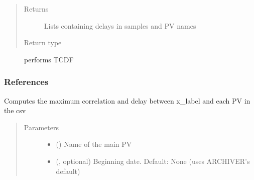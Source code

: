 \documentclass[letterpaper,10pt,english]{sphinxmanual}
\begin{document}
\begin{fulllineitems}
\begin{fulllineitems}
\begin{quote}
\begin{description}
\begin{itemize}
\end{itemize}

\item[{Returns}] \leavevmode
\sphinxAtStartPar
Lists containing delays in samples and PV names

\item[{Return type}] \leavevmode
\sphinxAtStartPar
{}

\end{description}\end{quote}


\nopagebreak

\begin{description}
\item[{}] \leavevmode
\sphinxAtStartPar
performs TCDF

\end{description}


\subsubsection*{References}

\end{fulllineitems}


\begin{fulllineitems}
\label{\detokenize{dataset:dataset.Dataset.correlate}}
\sphinxAtStartPar
Computes the maximum correlation and delay between x\_label and each PV in the csv
\begin{quote}\begin{description}
\item[{Parameters}] \leavevmode\begin{itemize}
\item {} 
\sphinxAtStartPar
{} () \textendash{} Name of the main PV

\item {} 
\sphinxAtStartPar
{} (, optional) \textendash{} Beginning date. Default: None (uses ARCHIVER’s default)


\end{itemize}
\end{description}
\end{quote}
\end{fulllineitems}
\end{fulllineitems}
\end{document}
